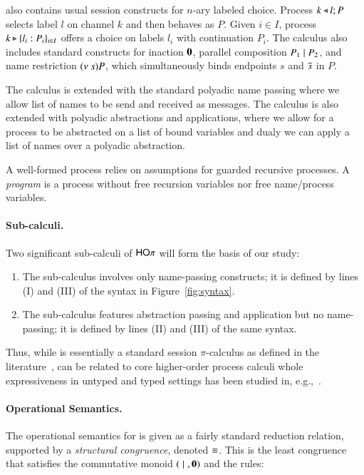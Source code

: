 \HOp also contains usual session constructs for $n$-ary labeled choice.
Process $k \triangleleft l ; P$ selects label $l$ on channel $k$ and then behaves as $P$. 
Given $i \in I$, 
process $k \triangleright \{l_i:P_i\}_{i \in I}$ offers a choice on labels $l_i$ with
continuation $P_i$.
The calculus also includes standard constructs for 
inaction $\mathbf{0}$, 
parallel composition $P_1 \;|\; P_2$, and 
name restriction $(\nu\ s) P$, which simultaneously binds endpoints $s$ and $\overline{s}$ in $P$.

The calculus is extended with the standard polyadic name passing where
we allow list of names to be send and received as messages. 
The calculus is also extended with polyadic abstractions and applications,
where we allow for a process to be abstracted on a list of
bound variables and dualy we can apply a list of names
over a polyadic abstraction.

A well-formed process relies on assumptions for guarded recursive processes.
A \emph{program} is a process without free 
recursion variables nor free name/process variables.



\paragraph{Sub-calculi.}
Two significant sub-calculi of $\mathsf{HO}\pi$ will form the basis of our study:
\begin{enumerate}[-]
\item The sub-calculus \sesp involves only name-passing constructs; it is 
defined by lines (\textsc{I}) and (\textsc{III}) of the syntax in Figure~\ref{fig:syntax}.
\item The sub-calculus \HO features abstraction passing and application but no name-passing; 
it is defined by lines (\textsc{II}) and (\textsc{III}) of the same syntax.
\end{enumerate}
Thus, while \sesp is essentially a standard session $\pi$-calculus as defined in the literature~\cite{},
\HO can be related to core higher-order process calculi whole expressiveness in untyped and typed settings
has been studied in, e.g.,~\cite{}.


\paragraph{Operational Semantics.}
The operational semantics for \HOp is given as a fairly standard reduction relation, supported by
a \emph{structural congruence}, denoted $\equiv$. This is 
the least congruence that satisfies the commutative monoid $(\;|\;, \mathbf{0})$
and the rules:

